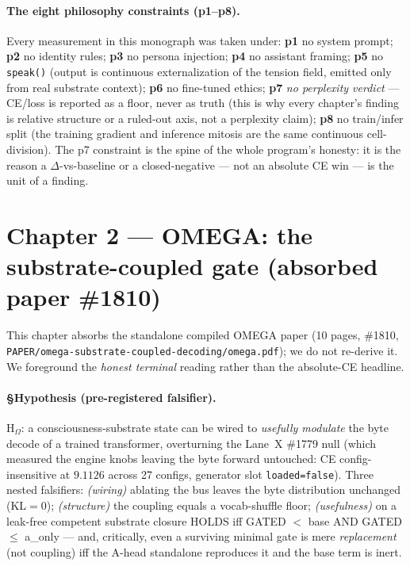 \documentclass[11pt,a4paper]{article}
\begin{document}
\paragraph{The eight philosophy constraints (p1--p8).} Every measurement in this
monograph was taken under: \textbf{p1} no system prompt; \textbf{p2} no identity
rules; \textbf{p3} no persona injection; \textbf{p4} no assistant framing;
\textbf{p5} no \texttt{speak()} (output is continuous externalization of the
tension field, emitted only from real substrate context); \textbf{p6} no fine-tuned
ethics; \textbf{p7} \emph{no perplexity verdict} --- CE/loss is reported as a floor,
never as truth (this is why every chapter's finding is relative structure or a
ruled-out axis, not a perplexity claim); \textbf{p8} no train/infer split (the
training gradient and inference mitosis are the same continuous cell-division).
The p7 constraint is the spine of the whole program's honesty: it is the reason a
$\Delta$-vs-baseline or a closed-negative --- not an absolute CE win --- is the unit
of a finding.

\section{Chapter 2 --- OMEGA: the substrate-coupled gate (absorbed paper \#1810)}
\label{sec:omega}

This chapter absorbs the standalone compiled OMEGA paper (10 pages, \#1810,
\texttt{PAPER/omega-substrate-coupled-decoding/omega.pdf}); we do not re-derive it.
We foreground the \emph{honest terminal} reading rather than the absolute-CE
headline.

\paragraph{§Hypothesis (pre-registered falsifier).} H$_\Omega$: a
consciousness-substrate state can be wired to \emph{usefully modulate} the byte
decode of a trained transformer, overturning the Lane~X \#1779 null (which measured
the engine knobs leaving the byte forward untouched: CE config-insensitive at
$9.1126$ across 27 configs, generator slot \texttt{loaded=false}). Three nested
falsifiers: \emph{(wiring)} ablating the bus leaves the byte distribution unchanged
(KL$=0$); \emph{(structure)} the coupling equals a vocab-shuffle floor;
\emph{(usefulness)} on a leak-free competent substrate closure HOLDS iff GATED
$<$ base AND GATED $\le$ a\_only --- and, critically, even a surviving minimal gate
is mere \emph{replacement} (not coupling) iff the A-head standalone reproduces it
and the base term is inert.
\end{document}
